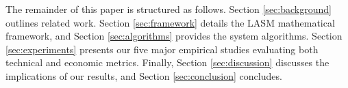 The remainder of this paper is structured as follows. Section \ref{sec:background} outlines related work. Section \ref{sec:framework} details the LASM mathematical framework, and Section \ref{sec:algorithms} provides the system algorithms. Section \ref{sec:experiments} presents our five major empirical studies evaluating both technical and economic metrics. Finally, Section \ref{sec:discussion} discusses the implications of our results, and Section \ref{sec:conclusion} concludes.

